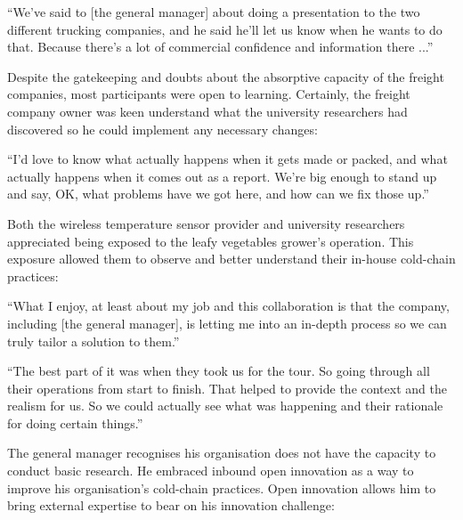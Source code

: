 \begin{displayquote}[Participant 16/1]
\small
\enquote{We've said to [the general manager] about doing a presentation to the two different trucking companies, and he said he'll let us know when he wants to do that. Because there’s a lot of commercial confidence and information there ...} 
\end{displayquote}
 

Despite the gatekeeping and doubts about the absorptive capacity of the freight companies, most participants were open to learning. Certainly, the freight company owner was keen understand what the university researchers had discovered so he could implement any necessary changes:

\begin{displayquote}[Participant 8/1]
\small
\enquote{I'd love to know what actually happens when it gets made or packed, and what actually happens when it comes out as a report. We're big enough to stand up and say, OK, what problems have we got here, and how can we fix those up.} 
\end{displayquote}
 

Both the wireless temperature sensor provider and university researchers appreciated being exposed to the leafy vegetables grower's operation. This exposure allowed them to observe and better understand their in-house cold-chain practices:

\begin{displayquote}[Participant 10/1]
\small
\enquote{What I enjoy, at least about my job and this collaboration is that the company, including [the general manager], is letting me into an in-depth process so we can truly tailor a solution to them.} 
\end{displayquote}
 

\begin{displayquote}[Participant 16/1]
\small
\enquote{The best part of it was when they took us for the tour. So going through all their operations from start to finish. That helped to provide the context and the realism for us. So we could actually see what was happening and their rationale for doing certain things.} 
\end{displayquote}
 

The general manager recognises his organisation does not have the capacity to conduct basic research. He embraced inbound open innovation as a way to improve his organisation's cold-chain practices. Open innovation allows him to bring external expertise to bear on his innovation challenge:

